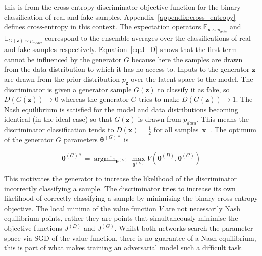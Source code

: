 \documentclass[twocolumn]{article}
\DeclareMathOperator*{\argmin}{\text{argmin}}
\numberwithin{equation}{section}
\begin{document}
this is from the cross-entropy discriminator objective function for the binary classification of real and fake 
samples. Appendix~\ref{appendix:cross_entropy} defines cross-entropy in this context. The expectation operators 
$\mathbb{E}_{\mathbf{x} \sim p_{data}}$ and $\mathbb{E}_{G(\mathbf{z}) \sim p_{model}}$ correspond to the ensemble 
averages over the classifications of real and fake samples respectively. Equation~\ref{eq:J_D} shows that the first 
term cannot be influenced by the generator $G$ because here the samples are drawn from the data distribution to which 
it has no access to. Inputs to the generator $\mathbf{z}$ are drawn from the prior distribution $p_\mathbf{z}$ over 
the latent-space to the model. The discriminator is given a generator sample $G(\mathbf{z})$ to classify it as fake, 
so $D(G(\mathbf{z})) \! \rightarrow \! 0$ whereas the generator $G$ tries to make $D(G(\mathbf{z})) \!  \rightarrow \! 1$. 
The Nash equilibrium is satisfied for the model and data distributions becoming identical (in the ideal case) so that 
$G(\mathbf{z})$ is drawn from $p_{data}$. This means the discriminator classification tends to $D(\mathbf{x}) = 
\frac{1}{2}$ for all samples~$\mathbf{x}$~\cite{gf_gan}. The optimum of the generator $G$ parameters 
$\bm{\theta}^{(G)*}$ is 

\begin{equation}
    \bm{\theta}^{(G)*} = \argmin_{\mathbf{\theta}^{(G)}}\max_{\mathbf{\theta}^{(D)}}
                          V({\mathbf{\theta}^{(D)}},{\mathbf{\theta}^{(G)}})
\end{equation}

This motivates the generator to increase the likelihood of the discriminator incorrectly classifying a sample. The 
discriminator tries to increase its own likelihood of correctly classifying a sample by minimising the binary 
cross-entropy objective. The local minima of the value function $V$ are not necessarily Nash equilibrium points, rather
they are points that simultaneously minimise the objective functions $J^{(D)}$ and $J^{(G)}$. Whilst both networks search 
the parameter space via SGD of the value function, there is no guarantee of a Nash equilibrium, this is part of what makes 
training an adversarial model such a difficult task.

\end{document}
